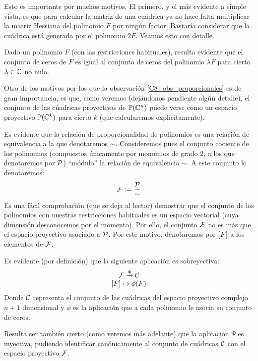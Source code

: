 Esto es importante por muchos motivos. El primero, y el más evidente a simple vista, es que para calcular la matriz de una cuádrica ya no hace falta multiplicar la matriz Hessiana del polinomio $F$ por ningún factor. Bastaría considerar que la cuádrica está generada por el polinomio $2F$. Veamos esto con detalle.
\begin{obs}
	\label{C8_obs_proporcionales}
	Dado un polinomio $F$ (con las restricciones habituales), resulta evidente que el conjunto de ceros de $F$ es igual al conjunto de ceros del polinomio $\lambda F$ para cierto $\lambda\in\mathbb{C}$ no nulo.
\end{obs}
Otro de los motivos por los que la observación \ref{C8_obs_proporcionales} es de gran importancia, es que, como veremos (dejándonos pendiente algún detalle), el conjunto de las cúadricas proyectivas de $\mathbb{P}(\mathbb{C}^n)$ puede verse como un espacio proyectivo $\mathbb{P}(\mathbb{C}^k)$ para cierto $k$ (que calcularemos explícitamente). 
\begin{obs}
	\label{C8_obs_pseudoCorrespondencia}
	Es evidente que la relación de proporcionalidad de polinomios es una relación de equivalencia a la que denotaremos $\sim$. Consideremos pues el conjunto cociente de los polinomios (compuestos únicamente por monomios de grado $2$, a los que denotaremos por $\mathcal{P}$) ``módulo'' la relación de equivalencia $\sim$. A este conjunto lo denotaremos:
	\[\mathcal{F}:=\frac{\mathcal{P}}{\sim}\]
	Es una fácil comprobación (que se deja al lector) demostrar que el conjunto de los polinomios con nuestras restricciones habituales es un espacio vectorial (cuya dimensión desconocemos por el momento). Por ello, el conjunto $\mathcal{F}$ no es más que el espacio proyectivo asociado a $\mathcal{P}$. Por este motivo, denotaremos por $\left [ F \right ]$ a los elementos de $\mathcal{F}$.
	
	Es evidente (por definición) que la siguiente aplicación es sobreyectiva:
	\[\begin{array}{c}
	\mathcal{F}\stackrel{\Psi}{\to}\mathcal{C}\\
	\left [ F \right ]\mapsto\phi(F)
	\end{array}\]
	Donde $\mathcal{C}$ representa el conjunto de las cuádricas del espacio proyectivo complejo $n+1$ dimensional y $\phi$ es la aplicación que a cada polinomio le asocia su conjunto de ceros.
	
	Resulta ser también cierto (como veremos más adelante) que la aplicación $\Psi$ es inyectiva, pudiendo identificar canónicamente al conjunto de cuádricas $\mathcal{C}$ con el espacio proyectivo $\mathcal{F}$.
\end{obs}
